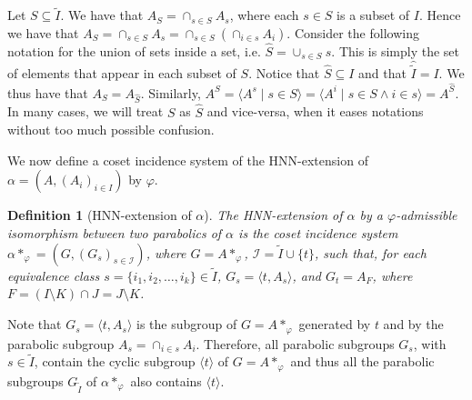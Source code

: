 \documentclass[11pt,letterpaper]{amsart}
\newtheorem{definition}[prop]{Definition}
\newcommand{\II}{\mathcal{I}}
\begin{document}
Let $S\subseteq \widetilde{I}$. We have that $A_S = \cap_{s\in S} A_s$, where each $s\in S$ is a subset of $I$. Hence we have that $A_S = \cap_{s\in S} A_s = \cap_{s\in S}(\cap_{i\in s} A_i)$. Consider the following notation for the union of sets inside a set, i.e. $\widehat{S}=\cup_{s\in S} s$. This is simply the set of elements that appear in each subset of $S$. Notice that $\widehat{S}\subseteq I$ and that $\widehat{\widetilde{I}}=I$.
We thus have that $A_S = A_{\widehat{S}}$.
Similarly, $A^S = \langle A^s\mid s\in S\rangle = \langle A^i \mid s\in S\wedge i\in s\rangle = A^{\widehat{S}}$. In many cases, we will treat $S$ as $\widehat{S}$ and vice-versa, when it eases notations without too much possible confusion.


We now define a coset incidence system of the HNN-extension of $\alpha =(A,(A_i)_{i\in I})$ by $\varphi$.
\begin{definition}[HNN-extension of $\alpha$]
    The HNN-extension of $\alpha$ by a $\varphi$-admissible isomorphism between two parabolics of $\alpha$ is the coset incidence system $\alpha*_\varphi = (G,(G_s)_{s\in \II})$, where $G = A*_\varphi$, $\II = \widetilde{I}\cup \{t\}$, such that, for each equivalence class $s=\{i_1,i_2,\ldots,i_k\}\in \widetilde{I}$, $G_s=\langle t, A_s\rangle$, and $G_t=A_F$, where $F=(I\setminus K)\cap J = J\setminus K$.
\end{definition}

Note that $G_s=\langle t, A_s\rangle$ is the subgroup of $G = A *_\varphi$ generated by $t$ and by the parabolic subgroup  $A_s=\cap_{i\in s} A_i$. 
Therefore, all parabolic subgroups $G_s$, with $s\in \widetilde{I}$, contain the cyclic subgroup $\langle t \rangle$ of $G= A *_\varphi$ and thus all the parabolic subgroups $G_{\widetilde{I}}$ of $\alpha *_\varphi$ also contains $\langle t \rangle$.
\end{document}
